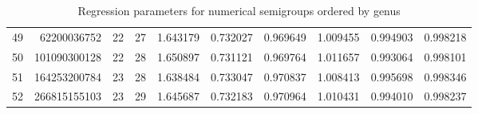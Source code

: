\documentclass[12pt]{amsart}
\begin{document}
\begin{table}
{\begin{tabular}{|r|rrrrrrrrr|}
\\
49 &62200036752 
& 22
& 27
&  1.643179 & 0.732027 &0.969649	
& 1.009455 & 0.994903 &0.998218	

\\
50 &101090300128 
& 22
& 28
&  1.650897 & 0.731121 &0.969764	
& 1.011657 & 0.993064 &0.998101	

\\
51 &164253200784 
& 23
& 28
&  1.638484 & 0.733047 &0.970837	
& 1.008413 & 0.995698 &0.998346	

\\
52 &266815155103 
& 23
& 29
&  1.645687 & 0.732183 &0.970964	
& 1.010431 & 0.994010 &0.998237	
\\\hline\end{tabular}}

  \caption{Regression parameters for numerical semigroups ordered by genus}
\label{tab:regressionparameters}
\end{table}
\end{document}
